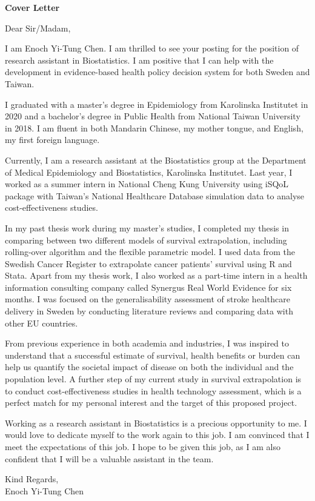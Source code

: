 \documentclass[a4paper,12pt]{article} %
\begin{document}
\begin{large}
\noindent	\textbf{Cover Letter}
\end{large}

\noindent Dear Sir/Madam,

I am Enoch Yi-Tung Chen. I am thrilled to see your posting for the position of research assistant in Biostatistics. I am positive that I can help with the development in evidence-based health policy decision system for both Sweden and Taiwan.

I graduated with a master's degree in Epidemiology from Karolinska Institutet in 2020 and a bachelor's degree in Public Health from National Taiwan University in 2018. I am fluent in both Mandarin Chinese, my mother tongue, and English, my first foreign language.

Currently, I am a research assistant at the Biostatistics group at the Department of Medical Epidemiology and Biostatistics, Karolinska Institutet. Last year, I worked as a summer intern in National Cheng Kung University using iSQoL package
with Taiwan's National Healthcare Database simulation data to analyse cost-effectiveness studies.

In my past thesis work during my master's studies, I completed my thesis in comparing between two different models of survival extrapolation, including rolling-over algorithm and the flexible parametric model. I used data from the Swedish Cancer Register to extrapolate cancer patients' survival using R and
Stata. Apart from my thesis work, I also worked as a part-time intern in a health information
consulting company called Synergus Real World Evidence for six months. I was focused on the generalisability assessment of stroke healthcare delivery in Sweden by conducting literature reviews and comparing data with other EU countries.

From previous experience in both academia and industries, I was inspired to understand that a successful estimate of survival, health benefits or burden can help us quantify the societal impact of disease on both the individual and the population level. A further step of my current study in survival extrapolation is to conduct cost-effectiveness studies in health technology assessment, which is a perfect match for my personal interest and the target of this proposed project.

Working as a research assistant in Biostatistics is a precious opportunity to me. I would love to dedicate myself to the work again to this job. I am convinced that I meet the expectations of this job. I hope to be given this job, as I am also confident that I will be a valuable assistant in the team.

Kind Regards, \\
\indent Enoch Yi-Tung Chen
\end{document}
